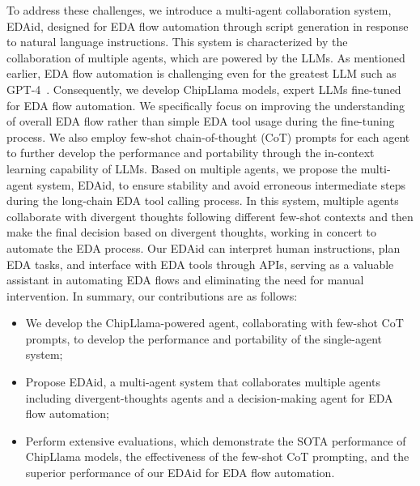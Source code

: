 To address these challenges, we introduce a multi-agent collaboration system, EDAid, designed for EDA flow automation through script generation in response to natural language instructions. 
This system is characterized by the collaboration of multiple agents, which are powered by the LLMs.
As mentioned earlier, EDA flow automation is challenging even for the greatest LLM such as GPT-4~\cite{openai2023gpt4}. 
Consequently, we develop ChipLlama models, expert LLMs fine-tuned for EDA flow automation. 
We specifically focus on improving the understanding of overall EDA flow rather than simple EDA tool usage during the fine-tuning process.
We also employ few-shot chain-of-thought (CoT) prompts for each agent to further develop the performance and portability through the in-context learning capability of LLMs. 
Based on multiple agents, we propose the multi-agent system, EDAid, to ensure stability and avoid erroneous intermediate steps during the long-chain EDA tool calling process.
In this system, multiple agents collaborate with divergent thoughts following different few-shot contexts and then make the final decision based on divergent thoughts, working in concert to automate the EDA process.
Our EDAid can interpret human instructions, plan EDA tasks, and interface with EDA tools through APIs, serving as a valuable assistant in automating EDA flows and eliminating the need for manual intervention.
In summary, our contributions are as follows:
\begin{itemize}[itemsep=0pt,topsep=0pt,parsep=0pt]
	\item We develop the ChipLlama-powered agent, collaborating with few-shot CoT prompts, to develop the performance and portability of the single-agent system;
    \item Propose EDAid, a multi-agent system that collaborates multiple agents including divergent-thoughts agents and a decision-making agent for EDA flow automation;
    \item Perform extensive evaluations, which demonstrate the SOTA performance of ChipLlama models, the effectiveness of the few-shot CoT prompting, and the superior performance of our EDAid for EDA flow automation. 
\end{itemize}

